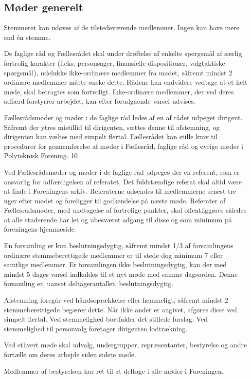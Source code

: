 \begin{list}
\subsection{Møder generelt}
\item  Stemmeret kan udøves af de tilstedeværende medlemmer. Ingen kan have mere end én stemme.
\item  De faglige råd og Fællesrådet skal under drøftelse af enkelte spørgsmål af særlig fortrolig karakter (f.eks.
              personsager, finansielle dispositioner, valgtaktiske spørgsmål), udelukke ikke-ordinære medlemmer fra
                mødet, såfremt mindst 2 ordinære medlemmer måtte ønske dette. Rådene kan endvidere vedtage at et helt
                     møde, skal betragtes som fortroligt.
                     Ikke-ordinære medlemmer, der ved deres adfærd forstyrrer arbejdet, kan efter forudgående varsel udvises.
\item  Fællesrådsmøder og møder i de faglige råd ledes af en af rådet udpeget dirigent. Såfremt der ytres mistillid til
              dirigenten, sættes denne til afstemning, og dirigenten kan væltes med simpelt flertal. Fællesrådet kan stille
                 krav til procedurer for gennemførelse af møder i Fællesråd, faglige råd og øvrige møder i Polyteknisk
                       Forening.
10
\item  Ved Fællesrådsmøder og møder i de faglige råd udpeges der en referent, som er ansvarlig for udfærdigelsen af referatet. Det fuldstændige referat skal altid være at finde i Foreningens arkiv. Referaterne udsendes til medlemmerne senest tre uger efter mødet og foreligger til godkendelse på næste møde. Referater af Fællesrådsmøder, med undtagelse af fortrolige punkter, skal offentliggøres således at alle studerende har let og ubesværet adgang til disse og som minimum på foreningens hjemmeside.

\item  En forsamling er kun beslutningsdygtig, såfremt mindst 1/3 af forsamlingens ordinære stemmeberettigede
         medlemmer er til stede dog minimum 7 eller samtlige medlemmer. Er forsamlingen ikke beslutningsdygtig,
        kan der med mindst 5 dages varsel indkaldes til et nyt møde med samme dagsorden. Denne forsamling er,
        uanset deltagerantallet, beslutningsdygtig.
\item  Afstemning foregår ved håndsoprækkelse eller hemmeligt, såfremt mindst 2 stemmeberettigede begærer
            dette. Når ikke andet er angivet, afgøres disse ved simpelt flertal. Ved stemmelighed bortfalder det stillede
             forslag. Ved stemmelighed til personvalg foretager dirigenten lodtrækning.
\item  Ved ethvert møde skal udvalg, undergrupper, repræsentanter, bestyrelse og andre fortælle om deres arbejde
          siden sidste møde.
\item  Medlemmer af bestyrelsen har ret til at deltage i alle møder i Foreningen.

\end{list}
